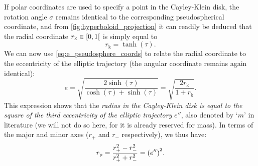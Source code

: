 If polar coordinates are used to specify a point in the Cayley-Klein disk, the rotation angle \(\sigma\) remains identical to the corresponding pseudospherical coordinate, and from \cref{fig:hyperboloid_projection} it can readily be deduced that the radial coordinate \(r_\text{k} \in \interval[open right]{0}{1}\) is simply equal to
\begin{equation}
    r_\text{k} = \tanh(\tau).
\end{equation}
We can now use \cref{eq:e_pseudosphere_coords} to relate the radial coordinate to the eccentricity of the elliptic trajectory (the angular coordinate remains again identical):
\begin{equation}
    e = \sqrt{\frac{2\sinh(\tau)}{\cosh(\tau) + \sinh(\tau)}} = \sqrt{\frac{2r_\text{k}}{1 + r_\text{k}}}. 
\end{equation}
This expression shows that the \emph{radius in the Cayley-Klein disk is equal to the square of the third eccentricity of the elliptic trajectory} \(e''\), also denoted by `\(m\)' in literature (we will not do so here, for it is already reserved for mass). In terms of the major and minor axes (\(r_+\) and \(r_-\) respectively), we thus have: \cite{Rapp1991}
\begin{equation}
    r_\text{p} = \frac{r_+^2 - r_-^2}{r_+^2 + r_-^2} = \qty(e'')^2.
    \label{eq:eccentricity_cayley}
\end{equation}

